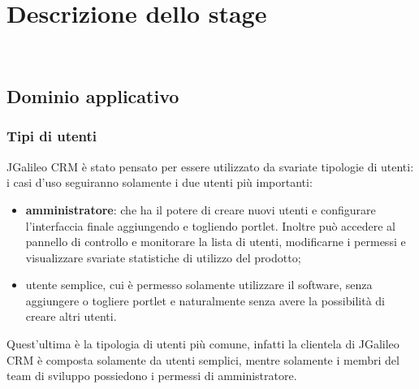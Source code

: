 
\chapter{Descrizione dello stage}
\label{cap:descrizione-stage}

\\


\section{Dominio applicativo}
\subsection{Tipi di utenti}
JGalileo CRM è stato pensato per essere utilizzato da svariate tipologie di utenti:
i casi d'uso seguiranno solamente i due utenti più importanti:
\begin{itemize}
	\item \textbf{amministratore}: che ha il potere di creare nuovi utenti e configurare l'interfaccia finale aggiungendo e togliendo \gls{portlet}. Inoltre può accedere al pannello di controllo e monitorare la lista di utenti, modificarne i permessi e visualizzare svariate statistiche di utilizzo del prodotto;
	\item{utente semplice}, cui è permesso solamente utilizzare il software, senza aggiungere o togliere \gls{portlet} e naturalmente senza avere la possibilità di creare altri utenti.\\
\end{itemize}
	Quest'ultima è la tipologia di utenti più comune, infatti la clientela di JGalileo CRM è composta solamente da utenti semplici, mentre solamente i membri del team di sviluppo possiedono i permessi di amministratore.
